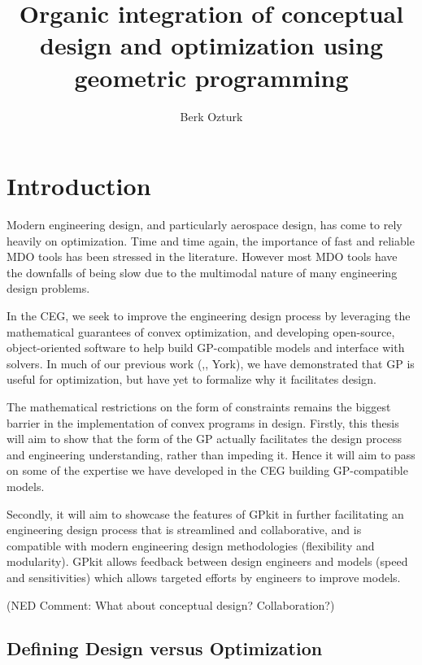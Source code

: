 \documentclass{aiaa-pretty}
\begin{document}
\title{Organic integration of conceptual design and optimization using geometric programming}
\author{Berk Ozturk}
\maketitle

\section{\bf Introduction}

Modern engineering design, and particularly aerospace design, has come to rely heavily on optimization. Time and time again, the importance of fast and reliable MDO tools has been stressed in the literature. However most MDO tools have the downfalls of being slow due to the multimodal nature of many engineering design problems.  
	
In the \gls{CEG}, we seek to improve the engineering design process by leveraging the mathematical guarantees of convex optimization, and developing open-source, object-oriented software to help build GP-compatible models and interface with solvers. In much of our previous work (\cite{gp_ac_design},\cite{sp_ac_design}, York), we have demonstrated that \gls{GP} is useful for optimization, but have yet to formalize why it facilitates design.
 
The mathematical restrictions on the form of constraints remains the biggest barrier in the implementation of convex programs in design. Firstly, this thesis will aim to show that the form of the GP actually facilitates the design process and engineering understanding, rather than impeding it. Hence it will aim to pass on some of the expertise we have developed in the \gls{CEG} building \gls{GP}-compatible models. 

Secondly, it will aim to showcase the features of GPkit in further facilitating an engineering design process that is streamlined and collaborative, and is compatible with modern engineering design methodologies (flexibility and modularity). GPkit allows feedback between design engineers and models (speed and sensitivities) which allows targeted efforts by engineers to improve models. 

(NED Comment: What about conceptual design? Collaboration?)

\subsection{Defining Design versus Optimization}
\end{document}
